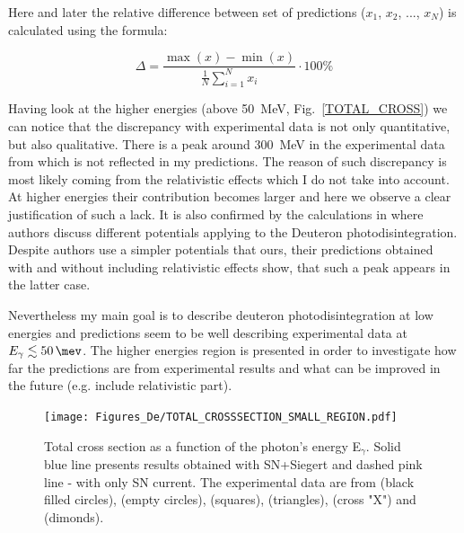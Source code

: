     Here and later the relative difference between set of predictions ($x_1$, $x_2$, ..., $x_N$) is calculated
    using the formula:

    \begin{equation}
        \Delta = \frac{\max(x) - \min(x)}{\frac{1}{N}\sum_{i=1}^N x_i} \cdot 100\%
    \end{equation}


    Having look at the higher energies (above 50~MeV, Fig.~\ref{TOTAL_CROSS})
    we can notice that the discrepancy with experimental data is not only 
    quantitative, but also qualitative.  There is a peak around 300~MeV
    in the experimental data from \cite{Bernabei1986} which is not
    reflected in my predictions. The reason of such discrepancy 
    is most likely coming from the relativistic effects
    which I do not take into account. At higher energies their contribution
    becomes larger and here we observe a clear justification of such a lack.
    It is also confirmed by the calculations in \cite{ArenhovelPhotodisint1991}
    where authors discuss different potentials applying to the Deuteron photodisintegration.
    Despite authors use a simpler potentials that ours, their predictions obtained with and without including
    relativistic effects show, that such a peak appears in the latter case. 
    
    Nevertheless my main goal is to describe deuteron photodisintegration at low energies and predictions seem to be well describing experimental data at
    $E_\gamma \lesssim \SI{50}{\mev}$. The higher energies region is presented in order
    to investigate how far the predictions are from experimental results and 
    what can be improved in the future (e.g. include relativistic part). 
    
    \begin{figure}[h]
        \begin{center}
        \texttt{[image: Figures\_De/TOTAL\_CROSSSECTION\_SMALL\_REGION.pdf]}
        \end{center}
        \caption{Total cross section as a function of the photon's energy E$_\gamma$.
        Solid blue line presents results obtained with SN+Siegert 
        and dashed pink line - with only SN current.
        The experimental data are from \cite{Bernabei1986} (black filled circles),
        \cite{BOSMAN1979} (empty circles),
        \cite{ARENDS1984} (squares),
        \cite{Skopik1974} (triangles),
        \cite{Moreh1989} (cross "X") and
        \cite{Birenbaum1985} (dimonds).
        }
        \label{TOTAL_CROSS_small}
    \end{figure}


